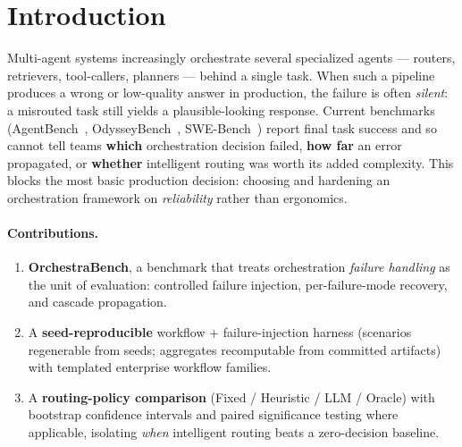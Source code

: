 \documentclass[sigconf,nonacm,anonymous]{acmart}  %
\begin{document}


\maketitle

\section{Introduction}
Multi-agent systems increasingly orchestrate several specialized agents ---
routers, retrievers, tool-callers, planners --- behind a single task. When such
a pipeline produces a wrong or low-quality answer in production, the failure is
often \emph{silent}: a misrouted task still yields a plausible-looking response.
Current benchmarks (AgentBench~\cite{agentbench}, OdysseyBench~\cite{odysseybench},
SWE-Bench~\cite{swebench}) report final task success and so cannot tell teams
\textbf{which} orchestration decision failed, \textbf{how far} an error
propagated, or \textbf{whether} intelligent routing was worth its added
complexity. This
blocks the most basic production decision: choosing and hardening an
orchestration framework on \emph{reliability} rather than ergonomics.

\paragraph{Contributions.}
\begin{enumerate}
  \item \textbf{OrchestraBench}, a benchmark that treats orchestration
  \emph{failure handling} as the unit of evaluation: controlled failure
  injection, per-failure-mode recovery, and cascade propagation.
  \item A \textbf{seed-reproducible} workflow + failure-injection harness
  (scenarios regenerable from seeds; aggregates recomputable from committed
  artifacts) with templated enterprise workflow families.
  \item A \textbf{routing-policy comparison} (Fixed / Heuristic / LLM / Oracle)
  with bootstrap confidence intervals and paired significance testing where
  applicable, isolating \emph{when} intelligent routing beats a zero-decision
  baseline.
\end{enumerate}
\end{document}
